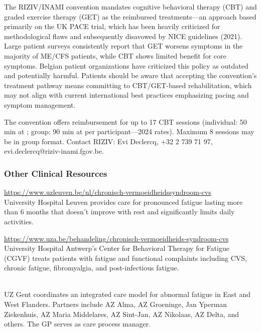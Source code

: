 \begin{remark}
The RIZIV/INAMI convention mandates cognitive behavioral therapy (CBT) and graded exercise therapy (GET) as the reimbursed treatments---an approach based primarily on the UK PACE trial, which has been heavily criticized for methodological flaws and subsequently disavowed by NICE guidelines (2021). Large patient surveys consistently report that GET worsens symptoms in the majority of ME/CFS patients, while CBT shows limited benefit for core symptoms. Belgian patient organizations have criticized this policy as outdated and potentially harmful. Patients should be aware that accepting the convention's treatment pathway means committing to CBT/GET-based rehabilitation, which may not align with current international best practices emphasizing pacing and symptom management.

The convention offers reimbursement for up to 17 CBT sessions (individual: 50 min at ; group: 90 min at  per participant---2024 rates). Maximum 8 sessions may be in group format. Contact RIZIV: Evi Declercq, +32 2 739 71 97, evi.declercq@riziv-inami.fgov.be.
\end{remark}

\subsubsection{Other Clinical Resources}

\begin{description}[style=nextline]
\item[UZ Leuven] \hfill \url{https://www.uzleuven.be/nl/chronisch-vermoeidheidssyndroom-cvs}\\
University Hospital Leuven provides care for pronounced fatigue lasting more than 6 months that doesn't improve with rest and significantly limits daily activities.

\item[UZA -- Centrum voor Gedragstherapie bij Vermoeidheid] \hfill \url{https://www.uza.be/behandeling/chronisch-vermoeidheids-syndroom-cvs}\\
University Hospital Antwerp's Center for Behavioral Therapy for Fatigue (CGVF) treats patients with fatigue and functional complaints including CVS, chronic fatigue, fibromyalgia, and post-infectious fatigue.

\item[UZ Gent CVS Network] \hfill\\
UZ Gent coordinates an integrated care model for abnormal fatigue in East and West Flanders. Partners include AZ Alma, AZ Groeninge, Jan Yperman Ziekenhuis, AZ Maria Middelares, AZ Sint-Jan, AZ Nikolaas, AZ Delta, and others. The GP serves as care process manager.
\end{description}

